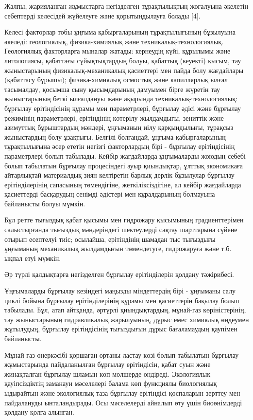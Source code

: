 \begin{multicols}{2}
Жалпы, жарияланған жұмыстарға негізделген тұрақтылықтың жоғалуына
әкелетін себептерді келесідей жүйелеуге және қорытындылауға болады
{[}4{]}.

Келесі факторлар тобы ұңғыма қабырғаларының тұрақтылығының бұзылуына
әкеледі: геологиялық, физика-химиялық және техникалық-технологиялық.
Геологиялық факторларға мыналар жатады: кернеудің күйі, құрылымы және
литологиясы, қабаттағы сұйықтықтардың болуы, қабаттық (кеуекті) қысым,
тау жыныстарының физикалық-механикалық қасиеттері мен пайда болу
жағдайлары (қабаттасу бұрышы); физика-химиялық осмостық және капиллярлық
ылғал тасымалдау, қосымша сыну қысымдарының дамуымен бірге жүретін тау
жыныстарының беткі ылғалдануы және ақырында техникалық-технологиялық:
бұрғылау ерітіндісінің құрамы мен параметрлері, бұрғылау әдісі және
бұрғылау режимінің параметрлері, ерітіндінің көтерілу жылдамдығы,
зениттік және азимуттық бұрыштардың мәндері, ұңғыманың иілу
қарқындылығы, тұрақсыз жыныстардың болу ұзақтығы. Белгілі болғандай,
ұңғыма қабырғаларының тұрақтылығына әсер ететін негізгі факторлардың
бірі - бұрғылау ерітіндісінің параметрлері болып табылады. Кейбір
жағдайларда ұңғымаларды жоюдың себебі болып табылатын бұрғылау
процесіндегі ауыр қиындықтар, ұлттық экономикаға айтарлықтай материалдық
зиян келтіретін барлық дерлік бұзылулар бұрғылау ерітінділерінің
сапасының төмендігіне, жеткіліксіздігіне, ал кейбір жағдайларда
қасиеттерді басқарудың сенімді әдістері мен құралдарының болмауына
байланысты болуы мүмкін.

Бұл ретте тығыздық қабат қысымы мен гидрожару қысымының градиенттерімен
салыстырғанда тығыздық мәндеріндегі шектеулерді сақтау шарттарына сүйене
отырып есептелуі тиіс; осылайша, ерітіндінің шамадан тыс тығыздығы
ұңғыманың механикалық жылдамдығын төмендетуге, гидрожаруға және т.б.
ықпал етуі мүмкін.

Әр түрлі қалдықтарға негізделген бұрғылау ерітінділерін қолдану
тәжірибесі.

Ұңғымаларды бұрғылау кезіндегі маңызды міндеттердің бірі - ұңғыманы салу
циклі бойына бұрғылау ерітінділерінің құрамы мен қасиеттерін бақылау
болып табылады. Бұл, атап айтқанда, әртүрлі қиындықтардың, мұнай-газ
көріністерінің, тау жыныстарының гидравликалық жарылуының, дұрыс емес
химиялық өңдеумен жұтылудың, бұрғылау ерітіндісінің тығыздығын дұрыс
бағаламаудың қаупімен байланысты.

Мұнай-газ өнеркәсібі қоршаған ортаны ластау көзі болып табылатын
бұрғылау жұмыстарында пайдаланылған бұрғылау ерітіндісін, қабат суын
және жинақталған бұрғылау шламын көп мөлшерде өндіреді. Экологиялық
қауіпсіздіктің заманауи мәселелері балама көп функциялы биологиялық
ыдырайтын және экологиялық таза бұрғылау ерітіндісі қоспаларын зерттеу
мен пайдалануды ынталандырады. Осы мәселелерді айналып өту үшін
биоөнімдерді қолдану қолға алынған.


\end{multicols}

